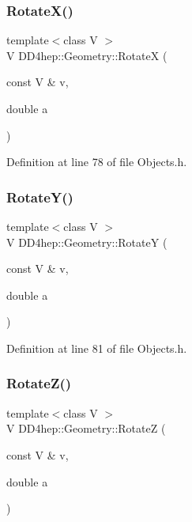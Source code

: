 \subsubsection{\texorpdfstring{Rotate\+X()}{RotateX()}}
{\footnotesize\ttfamily template$<$class V $>$ \\
V D\+D4hep\+::\+Geometry\+::\+RotateX (\begin{DoxyParamCaption}\item[{const V \&}]{v,  }\item[{double}]{a }\end{DoxyParamCaption})}



Definition at line 78 of file Objects.\+h.

\hypertarget{namespace_d_d4hep_1_1_geometry_a1ce692042d64099c435f9e23feaa41c2}{}\label{namespace_d_d4hep_1_1_geometry_a1ce692042d64099c435f9e23feaa41c2} 
\subsubsection{\texorpdfstring{Rotate\+Y()}{RotateY()}}
{\footnotesize\ttfamily template$<$class V $>$ \\
V D\+D4hep\+::\+Geometry\+::\+RotateY (\begin{DoxyParamCaption}\item[{const V \&}]{v,  }\item[{double}]{a }\end{DoxyParamCaption})}



Definition at line 81 of file Objects.\+h.

\hypertarget{namespace_d_d4hep_1_1_geometry_ad8325da9f2bdcecf327bd8a3f3f2185a}{}\label{namespace_d_d4hep_1_1_geometry_ad8325da9f2bdcecf327bd8a3f3f2185a} 
\subsubsection{\texorpdfstring{Rotate\+Z()}{RotateZ()}}
{\footnotesize\ttfamily template$<$class V $>$ \\
V D\+D4hep\+::\+Geometry\+::\+RotateZ (\begin{DoxyParamCaption}\item[{const V \&}]{v,  }\item[{double}]{a }\end{DoxyParamCaption})}




